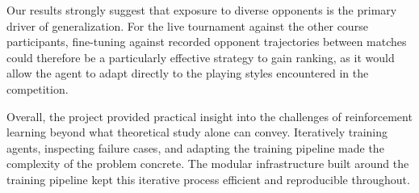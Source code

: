 \medskip
Our results strongly suggest that exposure to diverse opponents is the primary driver of 
generalization. For the live tournament against the other course participants, fine-tuning 
against recorded opponent trajectories between matches could therefore be a particularly 
effective strategy to gain ranking, as it would allow the agent to adapt directly to the 
playing styles encountered in the competition.

\medskip
Overall, the project provided practical insight into the challenges of reinforcement 
learning beyond what theoretical study alone can convey. Iteratively training agents, 
inspecting failure cases, and adapting the training pipeline made the complexity of 
the problem concrete. The modular infrastructure built around the training pipeline 
kept this iterative process efficient and reproducible throughout.



